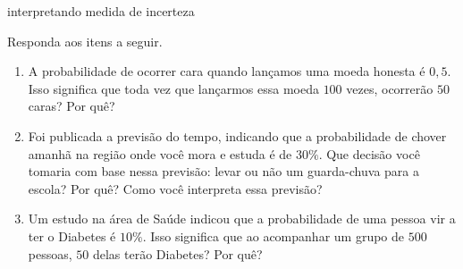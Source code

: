 \begin{task}{interpretando medida de incerteza}


Responda aos itens a seguir.
\begin{enumerate}
\item {} 
A probabilidade de ocorrer cara quando lançamos uma moeda honesta é $0{,}5$. Isso significa que toda vez que lançarmos essa moeda $100$ vezes, ocorrerão $50$ caras? Por quê?

\item {} 
Foi publicada a previsão do tempo, indicando que a probabilidade de chover amanhã na região onde você mora e estuda é de $30\%$. Que decisão você tomaria com base nessa previsão: levar ou não um guarda-chuva para a escola? Por quê? Como você interpreta essa previsão?

\item {} 
Um estudo na área de Saúde indicou que a probabilidade de uma pessoa vir a ter o Diabetes é $10\%$. Isso significa que ao acompanhar um grupo de $500$ pessoas, $50$ delas terão Diabetes? Por quê?

\end{enumerate}
\end{task}
\clearpage
